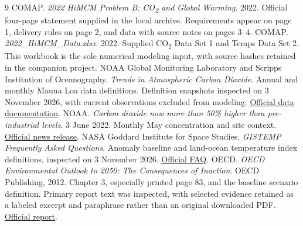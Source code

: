 \documentclass[11pt,a4paper]{article}
\newcommand{\txt}[2]{#2}
\newcommand{\CO}{CO\textsubscript{2}}
\begin{document}
\clearpage
{}
\begin{thebibliography}{9}
\txt{REF01}{COMAP. \emph{2022 HiMCM Problem B: \CO{} and Global Warming}. 2022. Official four-page statement supplied in the local archive. Requirements appear on page 1, delivery rules on page 2, and data with source notes on pages 3--4.}
\txt{REF02}{COMAP. \emph{2022\_HiMCM\_Data.xlsx}. 2022. Supplied \CO{} Data Set 1 and Temps Data Set 2. This workbook is the sole numerical modeling input, with source hashes retained in the companion project.}
\txt{REF03}{NOAA Global Monitoring Laboratory and Scripps Institution of Oceanography. \emph{Trends in Atmospheric Carbon Dioxide}. Annual and monthly Mauna Loa data definitions. Definition snapshots inspected on 3 November 2026, with current observations excluded from modeling. \href{https://gml.noaa.gov/ccgg/trends/data.html}{Official data documentation}.}
\txt{REF04}{NOAA. \emph{Carbon dioxide now more than 50\% higher than pre-industrial levels}. 3 June 2022. Monthly May concentration and site context. \href{https://www.noaa.gov/news-release/carbon-dioxide-now-more-than-50-higher-than-pre-industrial-levels}{Official news release}.}
\txt{REF05}{NASA Goddard Institute for Space Studies. \emph{GISTEMP Frequently Asked Questions}. Anomaly baseline and land-ocean temperature index definitions, inspected on 3 November 2026. \href{https://data.giss.nasa.gov/gistemp/faq/}{Official FAQ}.}
\txt{REF06}{OECD. \emph{OECD Environmental Outlook to 2050: The Consequences of Inaction}. OECD Publishing, 2012. Chapter 3, especially printed page 83, and the baseline scenario definition. Primary report text was inspected, with selected evidence retained as a labeled excerpt and paraphrase rather than an original downloaded PDF. \href{https://www.oecd.org/content/dam/oecd/en/publications/reports/2012/03/oecd-environmental-outlook-to-2050_g1g14e69/9789264122246-en.pdf}{Official report}.}
\end{thebibliography}
\end{document}
